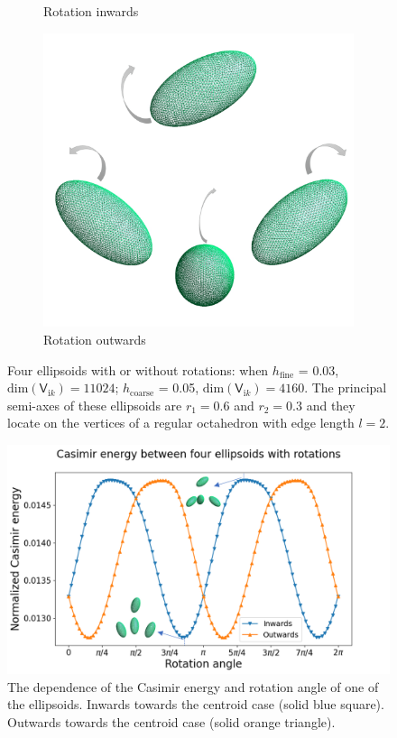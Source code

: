 \begin{figure}[H]
\begin{subfigure}{.5\linewidth}
    \caption{Rotation inwards}
    \label{Rotation inwards 4}
    \end{subfigure}%
    \begin{subfigure}{.5\linewidth}
    \centering
    \includegraphics[scale = 0.4]{figures/4_ellip_out}
    \caption{Rotation outwards}
    \label{Rotation outwards 4}
    \end{subfigure}
    \caption{Four ellipsoids with or without rotations:  when $h_\text{fine}$ = 0.03, $\text{dim}(\mathsf{V}_{\mathrm{i}k}) = 11024$; 
    $h_\text{coarse}$ = 0.05, $\text{dim}(\mathsf{V}_{\mathrm{i}k}) = 4160$. The principal semi-axes of these ellipsoids are $r_{1} = 0.6$ and $r_{2} = 0.3$
    and they locate on the vertices of a regular octahedron with edge length $l = 2$.}
    \label{Four ellipsoids with or without rotations}
    \end{figure}

    \begin{figure}[H]
        \centering
        \includegraphics[scale = 1]{figures/CasE_4_ellip.png}
        \caption{The dependence of the Casimir energy and rotation angle of one of the ellipsoids. Inwards towards the centroid case (solid blue square).
        Outwards towards the centroid case (solid orange triangle).}
        \label{Four ellipsoids}
    \end{figure}

